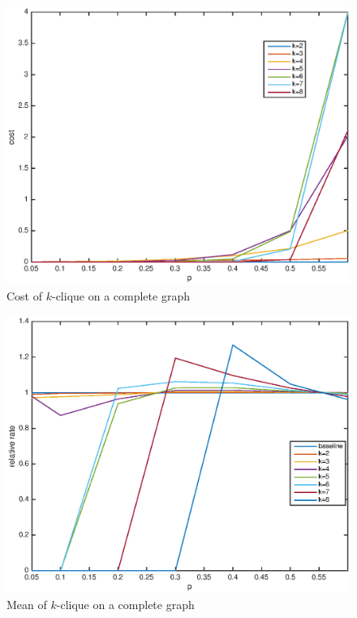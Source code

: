 \begin{figure}[h!]
\centering
\includegraphics[width=5in]{fig/cost.eps} %
\caption{Cost of $k$-clique on a complete graph}
\label{fig:perf}
\end{figure}

\begin{figure}[h!]
\centering
\includegraphics[width=5in]{fig/mean.eps} %
\caption{Mean of $k$-clique on a complete graph}
\label{fig:mean}
\end{figure}

